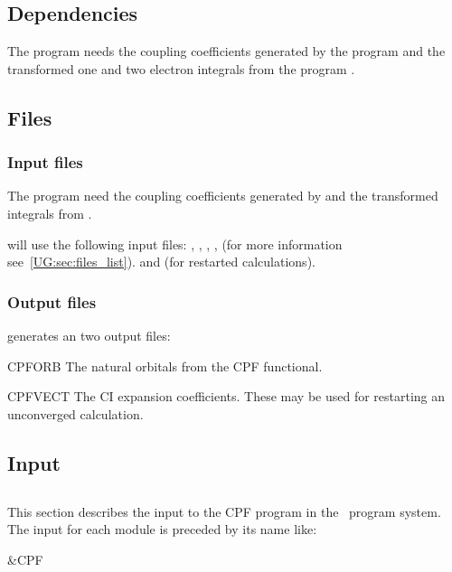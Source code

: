 \subsection{Dependencies}
\label{UG:sec:cpf_dependencies}
 
The   program needs the coupling
coefficients generated by the program
 and the transformed one and two electron
integrals from the program
.

\subsection{Files}
\label{UG:sec:cpf_files}
 
\subsubsection{Input files}

The
 program need the coupling coefficients generated by
 and the transformed integrals from
.

 will use the following input
files: , , ,
, 
(for more information see~\ref{UG:sec:files_list}).
and  (for restarted calculations).

\subsubsection{Output files}

 generates an two output files:
\begin{filelist}
\item[CPFORB]
The natural orbitals from the CPF functional.
\item[CPFVECT]
The CI expansion coefficients. These may be used for restarting an
unconverged calculation.
\end{filelist}

\subsection{Input}
\label{UG:sec:cpf_input}
 

\subsection{}
This section describes the input to the {\prgmfont CPF} program in the \molcas\ program system.
The input for each module is preceded by its name like:
\begin{inputlisting}
 &CPF
\end{inputlisting}

